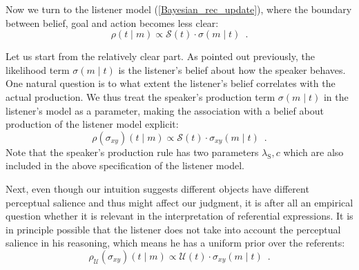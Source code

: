 Now we turn to the listener model (\ref{Bayesian_rec_update}), where the boundary between belief, goal and action becomes less clear:
$$\rho(t \mid m) \propto \mathcal{S}(t)\cdot \sigma(m \mid t) \enspace . $$

Let us start from the relatively clear part. As pointed out
previously, the likelihood term $\sigma(m \mid t)$ is the listener's
belief about how the speaker behaves. One natural question is to what
extent the listener's belief correlates with the actual production. We
thus treat the speaker's production term $\sigma(m \mid t)$ in the
listener's model as a parameter, making the association with a belief
about production of the listener model explicit:
\begin{equation} \label{listener-production}
\rho(\sigma_{xy})(t \mid m) \propto \mathcal{S}(t)\cdot \sigma_{xy}(m \mid t) \enspace .
\end{equation}
Note that the speaker's production rule has two parameters
$\lambda_\mathrm{S},c$ which are also included in the above
specification of the listener model.

Next, even though our intuition suggests different objects have different perceptual salience and thus might affect our judgment, it is after all an empirical question whether it is relevant in the interpretation of referential expressions. It is in principle possible that the listener does not take into account the perceptual salience in his reasoning, which means he has a uniform prior over the referents:
\begin{equation} \label{listener-production-uniform}
\rho_{\mathcal{U}}(\sigma_{xy})(t \mid m) \propto \mathcal{U}(t)\cdot \sigma_{xy}(m \mid t) \enspace .
\end{equation}

